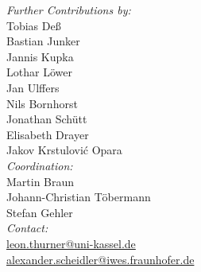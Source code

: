 \begin{titlepage}
\textit{Further Contributions by:} \\
Tobias Deß \\
Bastian Junker\\
Jannis Kupka\\
Lothar Löwer\\
Jan Ulffers\\
Nils Bornhorst\\
Jonathan Schütt\\
Elisabeth Drayer\\
Jakov Krstulović Opara\\[1em]

\textit{Coordination:}\\
Martin Braun \\
Johann-Christian Töbermann \\
Stefan Gehler \\[1em]


\flushright
\textit{Contact:} \\
\href{mailto:leon.thurner@uni-kassel.de}{leon.thurner@uni-kassel.de} \\
\hspace{1cm} \href{mailto:alexander.scheidler@iwes.fraunhofer.de}{alexander.scheidler@iwes.fraunhofer.de}




\end{titlepage}